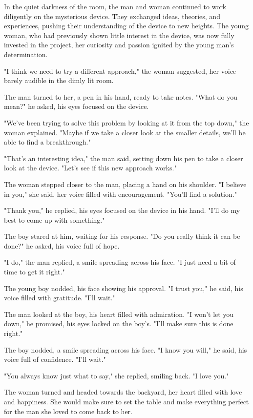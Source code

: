 \documentclass[smalldemyvopaper,11pt,twoside,onecolumn,openright,extrafontsizes]{memoir}
\begin{document}
In the quiet darkness of the room, the man and woman continued to work diligently on the mysterious device. They exchanged ideas, theories, and experiences, pushing their understanding of the device to new heights. The young woman, who had previously shown little interest in the device, was now fully invested in the project, her curiosity and passion ignited by the young man's determination.\par
"I think we need to try a different approach," the woman suggested, her voice barely audible in the dimly lit room.\par
The man turned to her, a pen in his hand, ready to take notes. "What do you mean?" he asked, his eyes focused on the device.\par
"We've been trying to solve this problem by looking at it from the top down," the woman explained. "Maybe if we take a closer look at the smaller details, we'll be able to find a breakthrough."\par
"That's an interesting idea," the man said, setting down his pen to take a closer look at the device. "Let's see if this new approach works."\par
The woman stepped closer to the man, placing a hand on his shoulder. "I believe in you," she said, her voice filled with encouragement. "You'll find a solution."\par
"Thank you," he replied, his eyes focused on the device in his hand. "I'll do my best to come up with something."\par
The boy stared at him, waiting for his response. "Do you really think it can be done?" he asked, his voice full of hope.\par
"I do," the man replied, a smile spreading across his face. "I just need a bit of time to get it right."\par
The young boy nodded, his face showing his approval. "I trust you," he said, his voice filled with gratitude. "I'll wait."\par
The man looked at the boy, his heart filled with admiration. "I won't let you down," he promised, his eyes locked on the boy's. "I'll make sure this is done right."\par
The boy nodded, a smile spreading across his face. "I know you will," he said, his voice full of confidence. "I'll wait."\par
"You always know just what to say," she replied, smiling back. "I love you."\par
The woman turned and headed towards the backyard, her heart filled with love and happiness. She would make sure to set the table and make everything perfect for the man she loved to come back to her.\par
\end{document}
